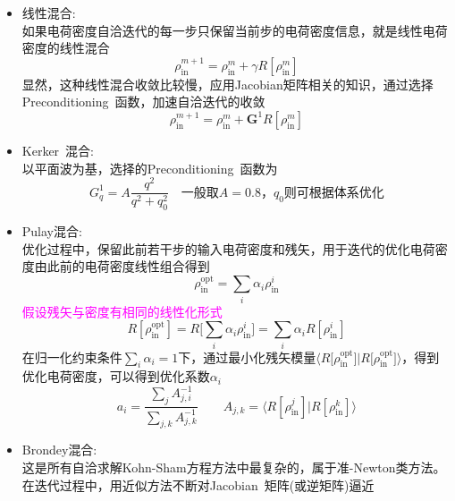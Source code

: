 {{	\begin{itemize}
		\item 线性混合:\\
			如果电荷密度自洽迭代的每一步只保留当前步的电荷密度信息，就是线性电荷密度的线性混合
			\begin{displaymath}
				\rho_{\mathrm{in}}^{m+1}=\rho_{\mathrm{in}}^{m}+\gamma R[\rho_{\mathrm{in}}^m]
			\end{displaymath}
	显然，这种线性混合收敛比较慢，应用\textrm{Jacobian}矩阵相关的知识，通过选择\textrm{Preconditioning~}函数，加速自洽迭代的收敛
	\begin{displaymath}
		\rho_{\mathrm{in}}^{m+1}=\rho_{\mathrm{in}}^{m}+\mathbf{G}^1R[\rho_{\mathrm{in}}^m]
	\end{displaymath}
		\item \textrm{Kerker~}混合:\\%
			以平面波为基，选择的\textrm{Preconditioning~}函数为
			\begin{displaymath}
				G_q^1=A\dfrac{q^2}{q^2+q_0^2}\quad\mbox{一般取$A=0.8$，$q_0$则可根据体系优化}
			\end{displaymath}
		\item \textrm{Pulay}混合:\\
			优化过程中，保留此前若干步的输入电荷密度和残矢，用于迭代的优化电荷密度由此前的电荷密度线性组合得到
			\begin{displaymath}
				\rho_{\mathrm{in}}^{\mathrm{opt}}=\sum_i\alpha_i\rho_{\mathrm{in}}^i
			\end{displaymath}
			\textcolor{magenta}{假设残矢与密度有相同的线性化形式}
			\begin{displaymath}
				R[\rho_{\mathrm{in}}^{\mathrm{opt}}]=R\bigg[\sum_i\alpha_i\rho_{\mathrm{in}}^i\bigg]=\sum_i\alpha_iR[\rho_{\mathrm{in}}^i]
			\end{displaymath}
			在归一化约束条件$\sum\limits_{i}\alpha_i=1$下，通过最小化残矢模量$\langle R\big[\rho_{\mathrm{in}}^{\mathrm{opt}}\big]|R\big[\rho_{\mathrm{in}}^{\mathrm{opt}}\big]\rangle$，得到优化电荷密度，可以得到优化系数$\alpha_i$
	\begin{displaymath}
		a_i=\dfrac{\sum\limits_{j}A_{j,i}^{-1}}{\sum\limits_{j,k}A_{j,k}^{-1}}\qquad A_{j,k}=\langle R[\rho_{\mathrm{in}}^{j}]|R[\rho_{\mathrm{in}}^{k}]\rangle 
	\end{displaymath}
\item \textrm{Brondey}混合:\\
	这是所有自洽求解\textrm{Kohn-Sham}方程方法中最复杂的，属于准-\textrm{Newton}类方法。在迭代过程中，用近似方法不断对\textrm{Jacobian~}矩阵(或逆矩阵)逼近\\

\end{itemize}}}
